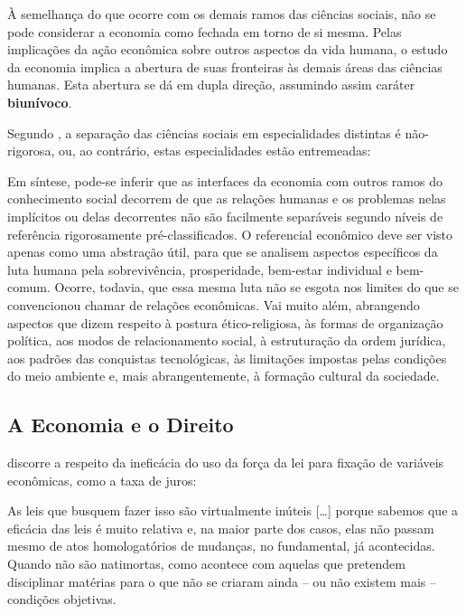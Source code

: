 \documentclass[
	10pt,				%
	openright,			%
	twoside,			%
	a5paper,			%
	english,			%
	french,				%
	spanish,			%
	brazil				%
	]{abntex2}
\renewenvironment{quote}
  {\small\list{}{\rightmargin=0.1cm \leftmargin=4cm}%
   \item\relax}
  {\endlist}
\begin{document}
\begin{quote}
À semelhança do que ocorre com os demais ramos das ciências sociais, não
se pode considerar a economia como fechada em torno de si mesma. Pelas
implicações da ação econômica sobre outros aspectos da vida humana, o
estudo da economia implica a abertura de suas fronteiras às demais áreas
das ciências humanas. Esta abertura se dá em dupla direção, assumindo
assim caráter \textbf{biunívoco}.
\end{quote}

Segundo , a separação das ciências sociais em
especialidades distintas é não-rigorosa, ou, ao contrário, estas
especialidades estão entremeadas:

\begin{quote}
Em síntese, pode-se inferir que as interfaces da economia com outros
ramos do conhecimento social decorrem de que as relações humanas e os
problemas nelas implícitos ou delas decorrentes não são facilmente
separáveis segundo níveis de referência rigorosamente pré-classificados.
O referencial econômico deve ser visto apenas como uma abstração útil,
para que se analisem aspectos específicos da luta humana pela
sobrevivência, prosperidade, bem-estar individual e bem-comum. Ocorre,
todavia, que essa mesma luta não se esgota nos limites do que se
convencionou chamar de relações econômicas. Vai muito além, abrangendo
aspectos que dizem respeito à postura ético-religiosa, às formas de
organização política, aos modos de relacionamento social, à estruturação
da ordem jurídica, aos padrões das conquistas tecnológicas, às
limitações impostas pelas condições do meio ambiente e, mais
abrangentemente, à formação cultural da sociedade.
\end{quote}

\subsection{A Economia e o Direito}\label{subsec:econ_dir}

 discorre a respeito da ineficácia do
uso da força da lei para fixação de variáveis econômicas, como a taxa de
juros:

\begin{quote}
As leis que busquem fazer isso são virtualmente inúteis {[}\ldots{}{]}
porque sabemos que a eficácia das leis é muito relativa e, na maior
parte dos casos, elas não passam mesmo de atos homologatórios de
mudanças, no fundamental, já acontecidas. Quando não são natimortas,
como acontece com aquelas que pretendem disciplinar matérias para o que
não se criaram ainda -- ou não existem mais -- condições objetivas.
\end{quote}
\end{document}

